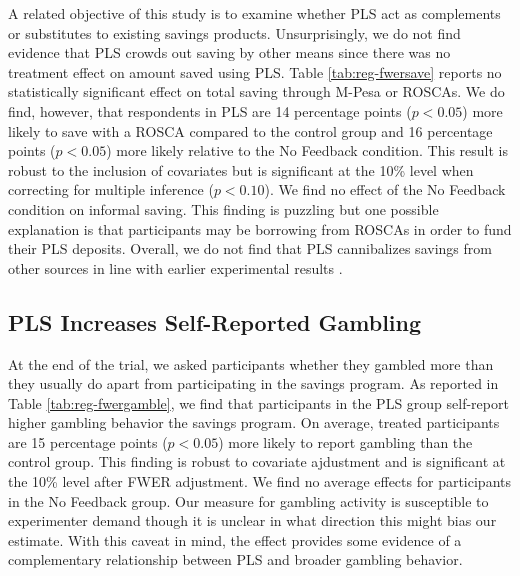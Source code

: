\documentclass[11pt]{article}
\begin{document}
		A related objective of this study is to examine whether PLS act as complements or substitutes to existing savings products. Unsurprisingly, we do not find evidence that PLS crowds out saving by other means since there was no treatment effect on amount saved using PLS. Table \ref{tab:reg-fwersave} reports no statistically significant effect on total saving through M-Pesa or ROSCAs. We do find, however, that respondents in PLS are 14 percentage points ($p < 0.05$) more likely to save with a ROSCA compared to the control group and 16 percentage points ($p < 0.05$) more likely relative to the No Feedback condition. This result is robust to the inclusion of covariates but is significant at the 10\% level when correcting for multiple inference ($p < 0.10$). We find no effect of the No Feedback condition on informal saving. This finding is puzzling but one possible explanation is that participants may be borrowing from ROSCAs in order to fund their PLS deposits. Overall, we do not find that PLS cannibalizes savings from other sources in line with earlier experimental results \parencite{atalay_savings_2014,filiz-ozbay_lottery_2015,dizon_leveraging_2016}.

		


	\subsection{PLS Increases Self-Reported Gambling}


		At the end of the trial, we asked participants whether they gambled more than they usually do apart from participating in the savings program. As reported in Table \ref{tab:reg-fwergamble}, we find that participants in the PLS group self-report higher gambling behavior the savings program. On average, treated participants are 15 percentage points ($p < 0.05$) more likely to report gambling than the control group. This finding is robust to covariate ajdustment and is significant at the 10\% level after FWER adjustment. We find no average effects for participants in the No Feedback group. Our measure for gambling activity is susceptible to experimenter demand though it is unclear in what direction this might bias our estimate. With this caveat in mind, the effect provides some evidence of a complementary relationship between PLS and broader gambling behavior.
\end{document}
